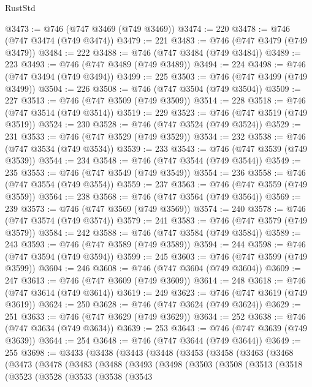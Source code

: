 \begin{lexlean}{RustStd}
\begin{coremodule}
@3473 := @746 (@747 @3469 (@749 @3469))
@3474 := 220
@3478 := @746 (@747 @3474 (@749 @3474))
@3479 := 221
@3483 := @746 (@747 @3479 (@749 @3479))
@3484 := 222
@3488 := @746 (@747 @3484 (@749 @3484))
@3489 := 223
@3493 := @746 (@747 @3489 (@749 @3489))
@3494 := 224
@3498 := @746 (@747 @3494 (@749 @3494))
@3499 := 225
@3503 := @746 (@747 @3499 (@749 @3499))
@3504 := 226
@3508 := @746 (@747 @3504 (@749 @3504))
@3509 := 227
@3513 := @746 (@747 @3509 (@749 @3509))
@3514 := 228
@3518 := @746 (@747 @3514 (@749 @3514))
@3519 := 229
@3523 := @746 (@747 @3519 (@749 @3519))
@3524 := 230
@3528 := @746 (@747 @3524 (@749 @3524))
@3529 := 231
@3533 := @746 (@747 @3529 (@749 @3529))
@3534 := 232
@3538 := @746 (@747 @3534 (@749 @3534))
@3539 := 233
@3543 := @746 (@747 @3539 (@749 @3539))
@3544 := 234
@3548 := @746 (@747 @3544 (@749 @3544))
@3549 := 235
@3553 := @746 (@747 @3549 (@749 @3549))
@3554 := 236
@3558 := @746 (@747 @3554 (@749 @3554))
@3559 := 237
@3563 := @746 (@747 @3559 (@749 @3559))
@3564 := 238
@3568 := @746 (@747 @3564 (@749 @3564))
@3569 := 239
@3573 := @746 (@747 @3569 (@749 @3569))
@3574 := 240
@3578 := @746 (@747 @3574 (@749 @3574))
@3579 := 241
@3583 := @746 (@747 @3579 (@749 @3579))
@3584 := 242
@3588 := @746 (@747 @3584 (@749 @3584))
@3589 := 243
@3593 := @746 (@747 @3589 (@749 @3589))
@3594 := 244
@3598 := @746 (@747 @3594 (@749 @3594))
@3599 := 245
@3603 := @746 (@747 @3599 (@749 @3599))
@3604 := 246
@3608 := @746 (@747 @3604 (@749 @3604))
@3609 := 247
@3613 := @746 (@747 @3609 (@749 @3609))
@3614 := 248
@3618 := @746 (@747 @3614 (@749 @3614))
@3619 := 249
@3623 := @746 (@747 @3619 (@749 @3619))
@3624 := 250
@3628 := @746 (@747 @3624 (@749 @3624))
@3629 := 251
@3633 := @746 (@747 @3629 (@749 @3629))
@3634 := 252
@3638 := @746 (@747 @3634 (@749 @3634))
@3639 := 253
@3643 := @746 (@747 @3639 (@749 @3639))
@3644 := 254
@3648 := @746 (@747 @3644 (@749 @3644))
@3649 := 255
@3698 := @3433
    (@3438
      (@3443
        (@3448
          (@3453
            (@3458
              (@3463
                (@3468
                  (@3473
                    (@3478
                      (@3483
                        (@3488
                          (@3493
                            (@3498
                              (@3503
                                (@3508
                                  (@3513
                                    (@3518
                                      (@3523
                                        (@3528
                                          (@3533
                                            (@3538
                                              (@3543

\end{coremodule}
\end{lexlean}
